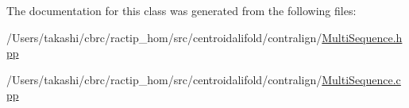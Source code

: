 The documentation for this class was generated from the following files\+:\begin{DoxyCompactItemize}
\item 
/\+Users/takashi/cbrc/ractip\+\_\+hom/src/centroidalifold/contralign/\hyperlink{_multi_sequence_8hpp}{Multi\+Sequence.\+hpp}\item 
/\+Users/takashi/cbrc/ractip\+\_\+hom/src/centroidalifold/contralign/\hyperlink{_multi_sequence_8cpp}{Multi\+Sequence.\+cpp}\end{DoxyCompactItemize}
